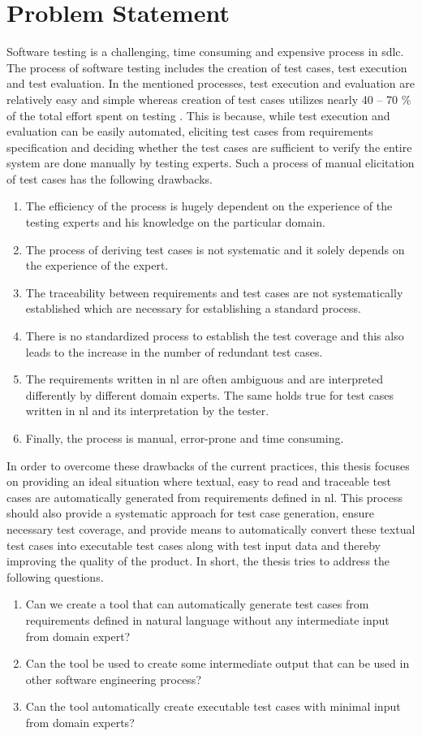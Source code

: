 \section{Problem Statement}
Software testing is a challenging, time consuming and expensive process in \gls{sdlc}. The process of software testing includes the creation of test cases, test execution and test evaluation. In the mentioned processes, test execution and evaluation are relatively easy and simple whereas creation of test cases utilizes nearly 40 – 70 \% of the total effort spent on testing \cite{kulkarni2014generating}. This is because, while test execution and evaluation can be easily automated, eliciting test cases from requirements specification and deciding whether the test cases are sufficient to verify the entire system are done manually by testing experts. Such a process of manual elicitation of test cases has the following drawbacks.
\begin{enumerate}
\item The efficiency of the process is hugely dependent on the experience of the testing experts and his knowledge on the particular domain.
\item The process of deriving test cases is not systematic and it solely depends on the experience of the expert.
\item The traceability between requirements and test cases are not systematically established which are necessary for establishing a standard process.
\item There is no standardized process to establish the test coverage and this also leads to the increase in the number of redundant test cases.
\item The requirements written in \gls{nl} are often ambiguous and are interpreted differently by different domain experts. The same holds true for test cases written in \gls{nl} and its interpretation by the tester.
\item Finally, the process is manual, error-prone and time consuming.
\end{enumerate}
In order to overcome these drawbacks of the current practices, this thesis focuses on providing an ideal situation where textual, easy to read and traceable test cases are automatically generated from requirements defined in \gls{nl}. This process should also provide a systematic approach for test case generation, ensure necessary test coverage, and provide means to automatically convert these textual test cases into executable test cases along with test input data and thereby improving the quality of the product. In short, the thesis tries to address the following questions.
\begin{enumerate}
\item Can we create a tool that can automatically generate test cases from requirements defined in natural language without any intermediate input from domain expert?
\item Can the tool be used to create some intermediate output that can be used in other software engineering process?
\item Can the tool automatically create executable test cases with minimal input from domain experts?
\end{enumerate}
